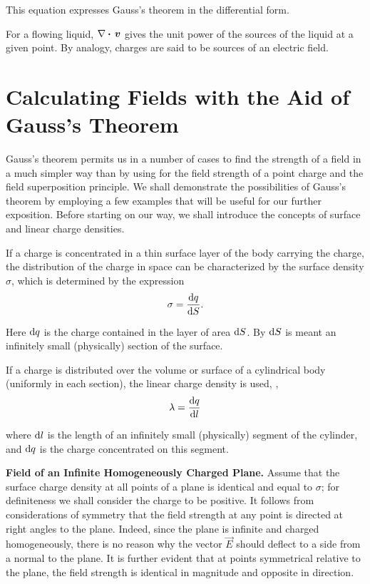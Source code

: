 \noindent
This equation expresses Gauss's theorem in the differential form.

For a flowing liquid, $\nabla\boldsymbol{\cdot}\,\boldsymbol{v}$ gives the unit power of the sources of the liquid at a given point. By analogy, charges are said to be sources of an electric field.

\section{Calculating Fields with the Aid of Gauss's Theorem}\label{sec:1_14}

Gauss's theorem permits us in a number of cases to find the strength of a field in a much simpler way than by using  for the field strength of a point charge and the field superposition principle. We shall demonstrate the possibilities of Gauss's theorem by employing a few examples that will be useful for our further exposition. Before starting on our way, we shall introduce the concepts of surface and linear charge densities.

If a charge is concentrated in a thin surface layer of the body carrying the charge, the distribution of the charge in space can be characterized by the surface density $\sigma$, which is determined by the expression
\begin{equation}\label{eq:1_118}
	\sigma = \dfrac{\mathrm{d} q}{\mathrm{d} S}.
\end{equation}

\noindent
Here $\mathrm{d} q$ is the charge contained in the layer of area $\mathrm{d} S$. By $\mathrm{d} S$ is meant an infinitely small (physically) section of the surface.

If a charge is distributed over the volume or surface of a cylindrical body (uniformly in each section), the linear charge density is used, \ie,
\begin{equation}\label{eq:1_119}
	\lambda = \dfrac{\mathrm{d} q}{\mathrm{d} l}
\end{equation}

\noindent
where $\mathrm{d} l$ is the length of an infinitely small (physically) segment of the cylinder, and $\mathrm{d} q$ is the charge concentrated on this segment.

\textbf{Field of an Infinite Homogeneously Charged Plane.} Assume that the surface charge density at all points of a plane is identical and equal to $\sigma$; for definiteness we shall consider the charge to be positive. It follows from considerations of symmetry that the field strength at any point is directed at right angles to the plane. Indeed, since the plane is infinite and charged homogeneously, there is no reason why the vector $\vec{E}$ should deflect to a side from a normal to the plane. It is further evident that at points symmetrical relative to the plane, the field strength is identical in magnitude and opposite in direction.

